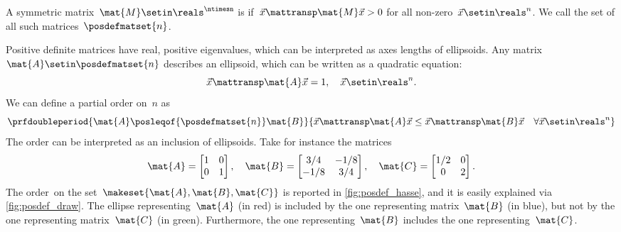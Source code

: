 \begin{definition}
    \label{def:positive-definite-matrices}
    A symmetric matrix~$\mat{M}\setin \reals^{\ntimesn}$ is  if~$\vec{x}\mattransp \mat{M}\vec{x}> 0$ for all non-zero~$\vec{x}\setin \reals^n$.
    We call the set of all such matrices~$\posdefmatset{n}$.
\end{definition}
Positive definite matrices have real, positive eigenvalues, which can be interpreted as axes lengths of ellipsoids.
Any matrix~$\mat{A}\setin \posdefmatset{n}$ describes an ellipsoid, which can be written as a quadratic equation:
\begin{equation}
    \label{eq:posdef-ellipsoid}
    \vec{x}\mattransp \mat{A}\vec{x}=1,\quad \vec{x}\setin \reals^n.
\end{equation}
We can define a partial order on~$n$ as
\begin{equation}
    \label{eq:posdef-order}
    \prfdoubleperiod{
        \mat{A}\posleqof{\posdefmatset{n}} \mat{B}
    }{
        \vec{x}\mattransp \mat{A}\vec{x}\leq \vec{x}\mattransp \mat{B}\vec{x} \quad \forall \vec{x}\setin \reals^n
    }
\end{equation}
The order can be interpreted as an inclusion of ellipsoids.
Take for instance the matrices
\begin{equation}
    \label{eq:posdef-matrices}
    \mat{A}=
    \begin{bmatrix}
        1 & 0 \\ 0& 1
    \end{bmatrix}, \quad \mat{B}=
    \begin{bmatrix}
        3/4 & -1/8 \\ -1/8& 3/4
    \end{bmatrix},\quad \mat{C}=
    \begin{bmatrix}
        1/2 & 0 \\0& 2
    \end{bmatrix}.
\end{equation}
The order~\posA on the set~$\makeset{\mat{A},\mat{B},\mat{C}}$ is reported in \cref{fig:posdef_hasse}, and it is easily explained via \cref{fig:posdef_draw}.
The ellipse representing~$\mat{A}$ (in red) is included by the one representing matrix~$\mat{B}$ (in blue), but not by the one representing matrix~$\mat{C}$ (in green).
Furthermore, the one representing~$\mat{B}$ includes the one representing~$\mat{C}$.

